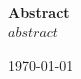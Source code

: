 	\HRule\\[1.5cm]
	
	  	{\large\bfseries Abstract}\\[0.4cm] %

$abstract$
  

	
	\vfill\vfill\vfill %
	
	{\large\today} %
	
	
	 
	
	\vfill %
	
	